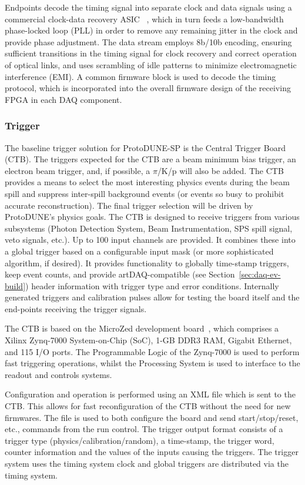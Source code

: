 Endpoints decode the timing signal into separate clock and data
signals using a commercial clock-data recovery ASIC ~\cite{siliconlabs:Si5344}, which in turn
feeds a low-bandwidth phase-locked loop (PLL) in order to remove any remaining jitter in
the clock and provide phase adjustment. The data stream employs 8b/10b
encoding, ensuring sufficient transitions in the timing signal for clock
recovery and correct operation of optical links, and uses scrambling
of idle patterns to minimize electromagnetic interference (EMI).
 A common firmware block is used to
decode the timing protocol, which is incorporated into the overall
firmware design of the receiving FPGA in each DAQ component. 

\subsubsection{Trigger}

The baseline trigger solution for ProtoDUNE-SP is the Central Trigger Board
(CTB). The triggers expected for the CTB are a beam minimum bias trigger,
an electron beam trigger, and, if possible, a $\pi$/K/p will also be added.
The CTB provides a means to select the most interesting physics events
during the beam spill and suppress inter-spill background events (or
events so busy to prohibit accurate reconstruction).  The final trigger
selection will be driven by ProtoDUNE's physics goals.  The CTB is
designed to receive triggers from various subsystems (Photon Detection
System, Beam Instrumentation, SPS spill signal, veto signals, etc.).
Up to 100 input channels are provided.  It combines these into a global
trigger based on a configurable input mask (or more sophisticated
algorithm, if desired).  It provides functionality to globally
time-stamp triggers, keep event counts, and provide artDAQ-compatible
(see Section~\ref{sec:daq-ev-build}) header information with trigger type
and error conditions.  Internally generated triggers and calibration
pulses allow for testing the board itself and the end-points receiving
the trigger signals.

The CTB is based on the MicroZed development board~\cite{avnet:microzed},
which comprises a Xilinx Zynq-7000 System-on-Chip (SoC), 1-GB DDR3 RAM,
Gigabit Ethernet, and 115 I/O ports.  The Programmable Logic of the
Zynq-7000 is used to perform fast triggering operations, whilst the
Processing System is used to interface to the readout and controls
systems.

Configuration and operation is performed using an XML file which is sent
to the CTB.  This allows for fast reconfiguration of the CTB without
the need for new firmwares.  The file is used to both configure the board
and send start/stop/reset, etc., commands from the run control.
The trigger output format consists of a trigger type (physics/calibration/random),
a time-stamp, the trigger word, counter information and the values 
of the inputs causing the triggers.  
The trigger system uses the timing system clock and global triggers are
distributed via the timing system.  


